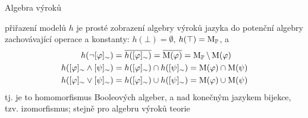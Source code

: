 \documentclass{beamer}
\begin{document}
\begin{frame}{Algebra výroků}


přiřazení modelů $h$ je prosté zobrazení algebry výroků jazyka do \alert{potenční algebry}  \alert{zachovávající} operace a konstanty: $h(\bot)=\emptyset$, $h(\top)=\operatorname{M}_\mathbb P$, a
{\small
\begin{align*}
    h(\neg[\varphi]_\sim)&=\overline{h([\varphi]_\sim)}=\overline{\operatorname{M}(\varphi)}=\operatorname{M}_\mathbb P\setminus\operatorname{M}(\varphi)\\
    h([\varphi]_\sim\land[\psi]_\sim)&=h([\varphi]_\sim)\cap h([\psi]_\sim)=\operatorname{M}(\varphi)\cap\operatorname{M}(\psi)\\
    h([\varphi]_\sim\lor[\psi]_\sim)&=h([\varphi]_\sim)\cup h([\psi]_\sim)=\operatorname{M}(\varphi)\cup\operatorname{M}(\psi)
\end{align*}
}
tj. je to  \alert{homomorfismus} Booleových algeber, a nad konečným jazykem bijekce, tzv. \alert{izomorfismus}; stejně pro algebru výroků teorie


\end{frame}
\end{document}
